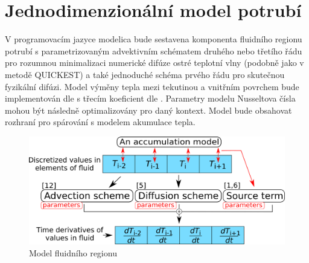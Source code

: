 \section{Jednodimenzionální model potrubí}
\label{sec:1Dpipe}
V programovacím jazyce modelica bude sestavena komponenta fluidního regionu
potrubí s parametrizovaným advektivním schématem druhého nebo třetího řádu pro
rozumnou minimalizaci numerické difúze ostré teplotní vlny (podobně jako v
metodě QUICKEST) a také jednoduché schéma prvého řádu pro skutečnou fyzikální
difúzi. Model výměny tepla mezi tekutinou a vnitřním povrchem bude
implementován dle \cite{Abraham2009} s třecím koeficient dle
\cite{Churchill1977}. Parametry modelu Nusseltova čísla mohou být následně
optimalizovány pro daný kontext. Model bude obsahovat rozhraní pro spárování s
modelem akumulace tepla.
\begin{figure}[h]
\begin{center}
  \includegraphics[scale=0.9]{figures/1D_model_pipe}
\end{center}
\caption{Model fluidního regionu}
\label{fig:pipe_model}
\end{figure}

